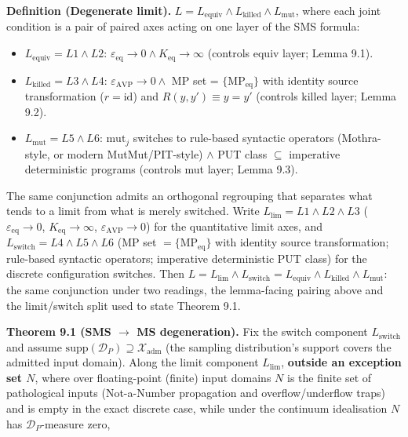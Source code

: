 \documentclass[manuscript,screen,review]{acmart}
\begin{document}
\textbf{Definition (Degenerate limit).}
$L = L_{\mathrm{equiv}} \wedge L_{\mathrm{killed}} \wedge L_{\mathrm{mut}}$, where each joint
condition is a pair of paired axes acting on one layer of the SMS
formula:

\begin{itemize}

\item
  $L_{\mathrm{equiv}} = L1 \wedge L2$: $\varepsilon_{\mathrm{eq}} \to 0 \wedge K_{\mathrm{eq}} \to \infty$ (controls equiv
  layer; Lemma 9.1).
\item
  $L_{\mathrm{killed}} = L3 \wedge L4$: $\varepsilon_{\mathrm{AVP}} \to 0 \wedge$ MP set = $\{\mathrm{MP}_{\mathrm{eq}}\}$
  with identity source transformation ($r = \mathrm{id}$) and
  $R(y,y') \equiv y = y'$ (controls killed layer; Lemma 9.2).
\item
  $L_{\mathrm{mut}} = L5 \wedge L6$: $\mathrm{mut}_j$ switches to rule-based syntactic
  operators (Mothra-style, or modern MutMut/PIT-style) $\wedge$ PUT class $\subseteq$ imperative deterministic
  programs (controls mut layer; Lemma 9.3).
\end{itemize}

The same conjunction admits an orthogonal regrouping that separates
what tends to a limit from what is merely switched. Write
$L_{\mathrm{lim}} = L1 \wedge L2 \wedge L3$
($\varepsilon_{\mathrm{eq}} \to 0$, $K_{\mathrm{eq}} \to \infty$,
$\varepsilon_{\mathrm{AVP}} \to 0$) for the quantitative limit axes, and
$L_{\mathrm{switch}} = L4 \wedge L5 \wedge L6$ (MP set
$= \{\mathrm{MP}_{\mathrm{eq}}\}$ with identity source transformation;
rule-based syntactic operators;
imperative deterministic PUT class) for the discrete configuration
switches. Then
$L = L_{\mathrm{lim}} \wedge L_{\mathrm{switch}} = L_{\mathrm{equiv}} \wedge L_{\mathrm{killed}} \wedge L_{\mathrm{mut}}$:
the same conjunction under two readings, the lemma-facing pairing above
and the limit/switch split used to state Theorem 9.1.

\textbf{Theorem 9.1 (SMS $\to$ MS degeneration).} Fix the switch
component $L_{\mathrm{switch}}$ and assume
$\mathrm{supp}(\mathcal{D}_P) \supseteq \mathcal{X}_{\mathrm{adm}}$ (the
sampling distribution's support covers the admitted input domain).
Along the limit component $L_{\mathrm{lim}}$, \textbf{outside an
exception set $N$}, where over floating-point (finite) input domains
$N$ is the finite set of pathological inputs (Not-a-Number propagation
and overflow/underflow traps) and is empty in the exact discrete case,
while under the continuum idealisation $N$ has
$\mathcal{D}_P$-measure zero,
\end{document}
